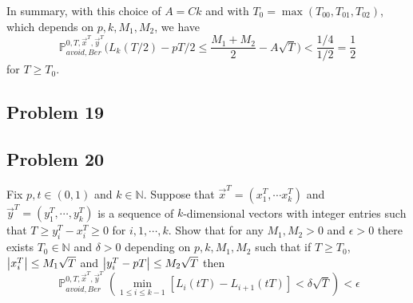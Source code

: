 \documentclass[12pt]{article}
\DeclareMathOperator{\pr}{\mathbb{P}}
\DeclarePairedDelimiter\abs{\lvert}{\rvert}
\begin{document}
	In summary, with this choice of $A = Ck$ and with $T_0 = \max(T_{00}, T_{01}, T_{02})$, which depends on $p,k,M_1,M_2$, we have
	\[
	\mathbb{P}^{0,T,\vec{x}^T,\vec{y}^T}_{avoid, Ber} \Big( L_k(T/2) - pT/2 \leq \frac{M_1+M_2}{2} - A\sqrt{T} \Big) < \frac{1/4}{1/2} = \frac{1}{2}
	\]
	for $T\geq T_0$. 
	


\subsection*{Problem 19}


\subsection*{Problem 20}
Fix $p,t\in (0,1)$ and $ k\in \mathbb{N}$. Suppose that $\vec x^T=(x_1^T,\cdots x_k^T)$ and $\vec y^T=(y_1^T,\cdots , y_k^T)$ is a sequence of $k$-dimensional vectors with integer entries such that $T\geq y_i^T-x_i^T\geq 0$ for $i,1,\cdots, k$. Show that for any $M_1,M_2>0$ and $\epsilon>0$ there exists $T_0\in\mathbb{N}$ and $\delta>0$ depending on $p,k,M_1,M_2$ such that if $T\geq T_0$, $\abs*{x_i^T}\leq M_1\sqrt{T}$ and $\abs*{y_i^T-pT}\leq M_2\sqrt{T}$ then 
\[
\pr^{0,T,\vec x^T, \vec y^T}_{avoid,Ber}\left(\min_{1\leq i\leq k-1} \left[L_i(tT)-L_{i+1}(tT)\right]<\delta\sqrt{T}\right)<\epsilon
\]
\end{document}
